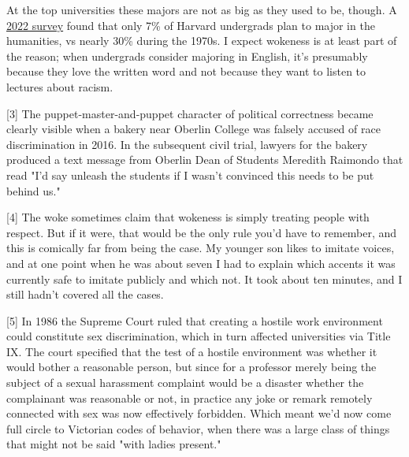 At
                  the top universities these majors are not as big as they used
                  to be, though. A
                  \href{https://www.newyorker.com/magazine/2023/03/06/the-end-of-the-english-major}{\underline{2022 survey}}
                  found that only 7\% of Harvard undergrads plan to major in the
                  humanities, vs nearly 30\% during the 1970s. I expect wokeness
                  is at least part of the reason; when undergrads consider
                  majoring in English, it's presumably because they love the
                  written word and not because they want to listen to lectures
                  about racism.

[3] The puppet-master-and-puppet character of political
                  correctness became clearly visible when a bakery near Oberlin
                  College was falsely accused of race discrimination in 2016. In
                  the subsequent civil trial, lawyers for the bakery produced a
                  text message from Oberlin Dean of Students Meredith Raimondo
                  that read "I'd say unleash the students if I wasn't convinced
                  this needs to be put behind us."

[4] The woke sometimes claim that wokeness is simply treating
                  people with respect. But if it were, that would be the only
                  rule you'd have to remember, and this is comically far from
                  being the case. My younger son likes to imitate voices, and at
                  one point when he was about seven I had to explain which
                  accents it was currently safe to imitate publicly and which
                  not. It took about ten minutes, and I still hadn't covered all
                  the cases.

[5] In 1986 the Supreme Court ruled that creating a hostile
                  work environment could constitute sex discrimination, which in
                  turn affected universities via Title IX. The court specified
                  that the test of a hostile environment was whether it would
                  bother a reasonable person, but since for a professor merely
                  being the subject of a sexual harassment complaint would be a
                  disaster whether the complainant was reasonable or not, in
                  practice any joke or remark remotely connected with sex was
                  now effectively forbidden. Which meant we'd now come full
                  circle to Victorian codes of behavior, when there was a large
                  class of things that might not be said "with ladies
                  present."

